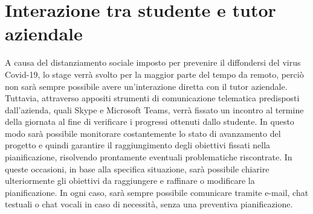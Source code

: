 
\section{Interazione tra studente e tutor aziendale}
	A causa del distanziamento sociale imposto per prevenire il diffondersi del virus Covid-19, lo stage verrà svolto per la maggior parte del tempo da remoto, perciò non sarà sempre possibile avere un'interazione diretta con il tutor aziendale.
	\newline
	Tuttavia, attraverso appositi strumenti di comunicazione telematica predisposti dall'azienda, quali Skype e Microsoft Teams, verrà fissato un incontro al termine della giornata al fine di verificare i progressi ottenuti dallo studente. In questo modo sarà possibile monitorare costantemente lo stato di avanzamento del progetto e quindi garantire il raggiungimento degli obiettivi fissati nella pianificazione, risolvendo prontamente eventuali problematiche riscontrate. 
	\newline
	In queste occasioni, in base alla specifica situazione, sarà possibile chiarire ulteriormente gli obiettivi da raggiungere e raffinare o modificare la pianificazione.
	\newline
	In ogni caso, sarà sempre possibile comunicare tramite e-mail, chat testuali o chat vocali in caso di necessità, senza una preventiva pianificazione.
	
